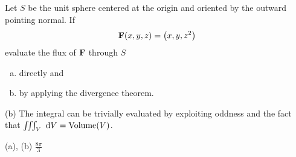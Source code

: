\subsection*{\Procedural}

\begin{question}
Let $S$ be the unit sphere centered at the origin and oriented
by the outward pointing normal. If 
\begin{equation*}
\mathbf{F}(x,y,z)=\big(x,y,z^2\big)
\end{equation*}
evaluate the flux of $\mathbf{F}$ through $S$
\begin{enumerate}[(a)]
\item
   directly and
\item
   by applying the divergence theorem.
\end{enumerate}
\end{question}

\begin{hint} 
(b) The integral can be trivially evaluated by exploiting oddness
and the fact that $ \tripInt_V\ \dee{V}=\text{Volume}(V)$.
\end{hint}

\begin{answer} 
(a), (b) $\frac{8\pi}{3}$
\end{answer}

